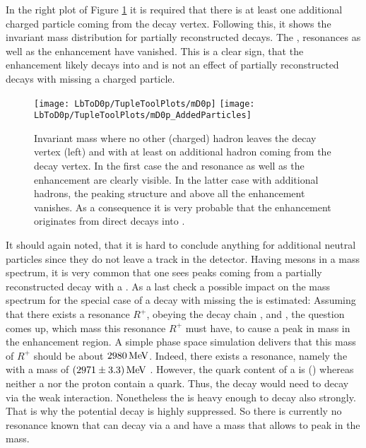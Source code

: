 In the right plot of Figure \ref{fig:mD0p_AdditionalParticles} it is required that there is at least one additional charged particle coming from the \Dz\proton\mun decay vertex.
Following this, it shows the invariant \Dz\proton mass distribution for partially reconstructed decays.
The \LcResI, \LcResII resonances as well as the enhancement have vanished.
This is a clear sign, that the enhancement likely decays into \Dz\proton and is not an effect of partially reconstructed decays with missing a charged particle.
\begin{figure}[ptb]
	\centering
	\texttt{[image: LbToD0p/TupleToolPlots/mD0p]}
	\texttt{[image: LbToD0p/TupleToolPlots/mD0p\_AddedParticles]}
	\caption{Invariant \Dz\proton mass where no other (charged) hadron leaves the \Dz\proton\mun decay vertex (left) and with at least on additional hadron coming from the \Dz\proton\mun decay vertex.
             In the first case the \LcResI and \LcResII resonance as well as the enhancement are clearly visible.
             In the latter case with additional hadrons, the peaking structure and above all the enhancement vanishes. 
             As a consequence it is very probable that the enhancement originates from direct decays into \Dz\proton.
    }
	\label{fig:mD0p_AdditionalParticles}
\end{figure}

It should again noted, that it is hard to conclude anything for additional neutral particles since they do not leave a track in the detector.
Having \D mesons in a mass spectrum, it is very common that one sees peaks coming from a partially reconstructed decay with a \decay{\Dstar}{\D\pion}.
As a last check a possible impact on the \Dz\proton mass spectrum for the special case of a \decay{\Dstarz}{\Dz\piz} decay with missing the \piz is estimated:
Assuming that there exists a resonance $R^{+}$, obeying the decay chain ,  and \decay{\Dstarz}{\Dz\piz}, the question comes up, which mass this resonance $R^{+}$ must have, to cause a peak in \Dz\proton mass in the enhancement region.
A simple phase space simulation delivers that this mass of $R^{+}$ should be about $2980\mathrm{\,Me\kern -0.1em V}$.
Indeed, there exists a resonance, namely the  with a mass of $(2971 \pm 3.3)\mathrm{\,Me\kern -0.1em V}$ \cite{PDG}.
However, the quark content of a \Xicp is (\uquark\cquark\squark) whereas neither a \Dstarz nor the proton contain a \squark quark.
Thus, the decay  would need to decay via the weak interaction.
Nonetheless the  is heavy enough to decay also strongly. 
That is why the potential decay  is highly suppressed.
So there is currently no resonance known that can decay via a \Dstarz\proton and have a mass that allows to peak in the \Dz\proton mass.


